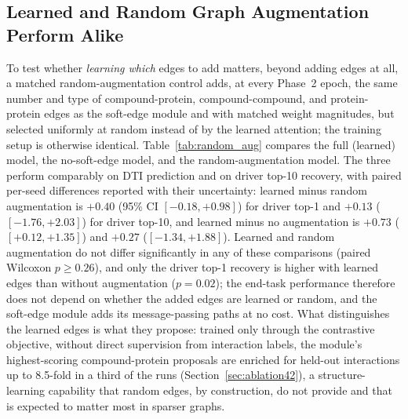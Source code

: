 \documentclass[11pt,letterpaper]{article}
\begin{document}
\subsection{Learned and Random Graph Augmentation Perform Alike}
\label{sec:random_aug}
To test whether \emph{learning which} edges to add matters, beyond adding edges at all, a matched random-augmentation control adds, at every Phase~2 epoch, the same number and type of compound-protein, compound-compound, and protein-protein edges as the soft-edge module and with matched weight magnitudes, but selected uniformly at random instead of by the learned attention; the training setup is otherwise identical. Table~\ref{tab:random_aug} compares the full (learned) model, the no-soft-edge model, and the random-augmentation model. The three perform comparably on DTI prediction and on driver top-10 recovery, with paired per-seed differences reported with their uncertainty: learned minus random augmentation is $+0.40$ (95\% CI $[-0.18,+0.98]$) for driver top-1 and $+0.13$ ($[-1.76,+2.03]$) for driver top-10, and learned minus no augmentation is $+0.73$ ($[+0.12,+1.35]$) and $+0.27$ ($[-1.34,+1.88]$). Learned and random augmentation do not differ significantly in any of these comparisons (paired Wilcoxon $p\geq0.26$), and only the driver top-1 recovery is higher with learned edges than without augmentation ($p=0.02$); the end-task performance therefore does not depend on whether the added edges are learned or random, and the soft-edge module adds its message-passing paths at no cost. What distinguishes the learned edges is what they propose: trained only through the contrastive objective, without direct supervision from interaction labels, the module's highest-scoring compound-protein proposals are enriched for held-out interactions up to 8.5-fold in a third of the runs (Section~\ref{sec:ablation42}), a structure-learning capability that random edges, by construction, do not provide and that is expected to matter most in sparser graphs.

\begin{table}[!t]
\centering
\caption{Learned versus random graph augmentation, mean $\pm$ standard deviation over 30 runs. Driver top-1: driver kinases (of 10) with an active drug ranked first; driver top-10: known actives among the 10 top-ranked drugs summed over the drivers.}
\label{tab:random_aug}
\end{table}
\end{document}
